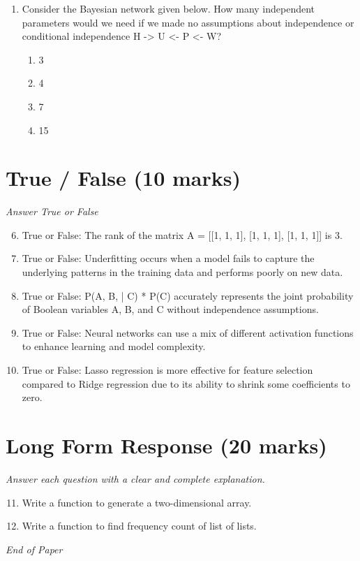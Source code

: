 \documentclass[12pt]{article}
\begin{document}
\begin{enumerate}[label=\arabic*.]
\begin{enumerate}[label=(\alph*)]
    \item True, True
    \item False, False
    \item True, False
    \item False, True
\end{enumerate}
\item Consider the Bayesian network given below. How many independent parameters would we need if we made no assumptions about independence or conditional independence H -\textgreater{} U \textless{}- P \textless{}- W?
\begin{enumerate}[label=(\alph*)]
    \item 3
    \item 4
    \item 7
    \item 15
\end{enumerate}
\end{enumerate}

\section*{True / False (10 marks)}
\textit{Answer True or False}
\begin{enumerate}[label=\arabic*.]
\setcounter{enumi}{5}
\item True or False: The rank of the matrix A = [[1, 1, 1], [1, 1, 1], [1, 1, 1]] is 3.
\item True or False: Underfitting occurs when a model fails to capture the underlying patterns in the training data and performs poorly on new data.
\item True or False: P(A, B, | C) * P(C) accurately represents the joint probability of Boolean variables A, B, and C without independence assumptions.
\item True or False: Neural networks can use a mix of different activation functions to enhance learning and model complexity.
\item True or False: Lasso regression is more effective for feature selection compared to Ridge regression due to its ability to shrink some coefficients to zero.
\end{enumerate}

\section*{Long Form Response (20 marks)}
\textit{Answer each question with a clear and complete explanation.}
\begin{enumerate}[label=\arabic*.]
\setcounter{enumi}{10}
\item Write a function to generate a two-dimensional array.
\item Write a function to find frequency count of list of lists.
\end{enumerate}

\vfill
\noindent\textit{End of Paper}
\end{document}

